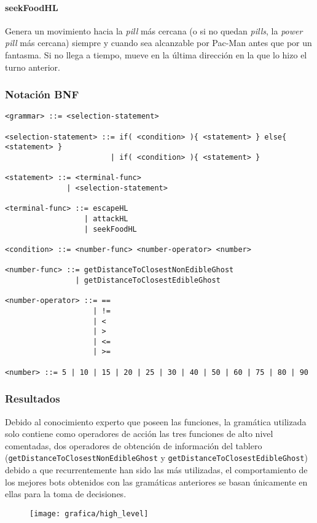 \paragraph{seekFoodHL}
Genera un movimiento hacia la \textit{pill} más cercana (o si no quedan \textit{pills}, la \textit{power pill} más cercana) siempre y cuando sea alcanzable por Pac-Man antes que por un fantasma. Si no llega a tiempo, mueve en la última dirección en la que lo hizo el turno anterior.

\subsubsection{Notación BNF}
\begin{lstlisting}[frame=single, breaklines=no, basicstyle=\fontsize{10}{11}\ttfamily, caption=Gramática de alto nivel.]
<grammar> ::= <selection-statement>

<selection-statement> ::= if( <condition> ){ <statement> } else{ <statement> }
                        | if( <condition> ){ <statement> }

<statement> ::= <terminal-func>
              | <selection-statement>

<terminal-func> ::= escapeHL
                  | attackHL
                  | seekFoodHL

<condition> ::= <number-func> <number-operator> <number>

<number-func> ::= getDistanceToClosestNonEdibleGhost
                | getDistanceToClosestEdibleGhost

<number-operator> ::= ==
                    | !=
                    | <
                    | >
                    | <=
                    | >=

<number> ::= 5 | 10 | 15 | 20 | 25 | 30 | 40 | 50 | 60 | 75 | 80 | 90
\end{lstlisting}

\subsubsection{Resultados}
Debido al conocimiento experto que poseen las funciones, la gramática utilizada solo contiene como operadores de acción las tres funciones de alto nivel comentadas, dos operadores de obtención de información del tablero  (\texttt{getDistanceToClosestNonEdibleGhost} y \texttt{getDistanceToClosestEdibleGhost}) debido a que recurrentemente han sido las más utilizadas, el comportamiento de los mejores bots obtenidos con las gramáticas anteriores se basan únicamente en ellas para la toma de decisiones.
\begin{figure}[H]
\centering
\texttt{[image: grafica/high\_level]}
\end{figure}

